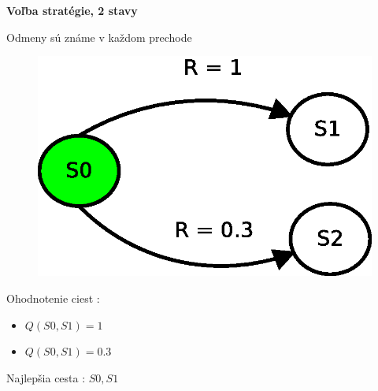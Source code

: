 \documentclass[xcolor=dvipsnames]{beamer}
\begin{document}
\begin{frame}{\bf Voľba stratégie, 2 stavy}

  Odmeny sú známe v každom prechode

  \begin{figure}[!htb]
  \centering
  \includegraphics[scale=.6]{../diagrams/rf_two_states.eps}
  \end{figure}

  Ohodnotenie ciest :
  \begin{itemize}
    \item $Q(S0, S1) = 1$
    \item $Q(S0, S1) = 0.3$
  \end{itemize}

  Najlepšia cesta : $S0, S1$
\end{frame}
\end{document}
